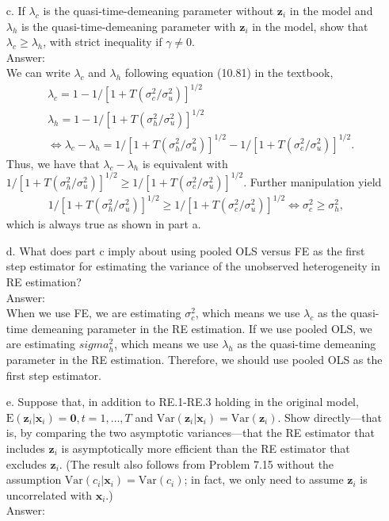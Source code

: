 \documentclass[10pt]{article}
\newcommand{\E}{\text{E}}
\newcommand{\V}{\text{Var}}
\begin{document}
\begin{enumerate}
\item[c.] If $\lambda_c$ is the quasi-time-demeaning parameter without $\textbf{z}_i$ in the model and $\lambda_h$ is the quasi-time-demeaning parameter with $\textbf{z}_i$ in the model, show that $\lambda_c\geq\lambda_h$, with strict inequality if $\gamma\neq0$. 
\\ Answer: \\
We can write $\lambda_c$ and $\lambda_h$ following equation (10.81) in the textbook,
\begin{align*}
    &\lambda_c=1-{1/[1+T(\sigma_c^2/\sigma_u^2)]}^{1/2}\\
    &\lambda_h=1-{1/[1+T(\sigma_h^2/\sigma_u^2)]}^{1/2}\\
    &\Leftrightarrow \lambda_c-\lambda_h={1/[1+T(\sigma_h^2/\sigma_u^2)]}^{1/2}-{1/[1+T(\sigma_c^2/\sigma_u^2)]}^{1/2}.
\end{align*}
Thus, we have that $\lambda_c-\lambda_h$ is equivalent with ${1/[1+T(\sigma_h^2/\sigma_u^2)]}^{1/2}\geq{1/[1+T(\sigma_c^2/\sigma_u^2)]}^{1/2}$. Further manipulation yield
\begin{align*}
    {1/[1+T(\sigma_h^2/\sigma_u^2)]}^{1/2}\geq{1/[1+T(\sigma_c^2/\sigma_u^2)]}^{1/2}\Leftrightarrow
    \sigma_c^2\geq\sigma_h^2,
\end{align*}
which is always true as shown in part a.

\item[d.] What does part c imply about using pooled OLS versus FE as the first step estimator for estimating the variance of the unobserved heterogeneity in RE estimation? 
\\ Answer: \\
When we use FE, we are estimating $\sigma_c^2$, which means we use $\lambda_c$ as the quasi-time demeaning parameter in the RE estimation. If we use pooled OLS, we are estimating $sigma_h^2$, which means we use  $\lambda_h$ as the quasi-time demeaning parameter in the RE estimation. Therefore, we should use pooled OLS as the first step estimator.

\item[e.] Suppose that, in addition to RE.1-RE.3 holding in the original model, $\E(\textbf{z}_i|\textbf{x}_i)=\textbf{0}, t=1,\ldots,T$ and $\V(\textbf{z}_i|\textbf{x}_i)=\V(\textbf{z}_i)$. Show directly---that is, by comparing the two asymptotic variances---that the RE estimator that includes $\textbf{z}_i$ is asymptotically more efficient than the RE estimator that excludes $\textbf{z}_i$. (The result also follows from Problem 7.15 without the assumption $\V(c_i|\textbf{x}_i)=\V(c_i)$; in fact, we only need to assume $\textbf{z}_i$ is uncorrelated with $\textbf{x}_i$.)
\\ Answer: \\

\end{enumerate}
\end{document}
